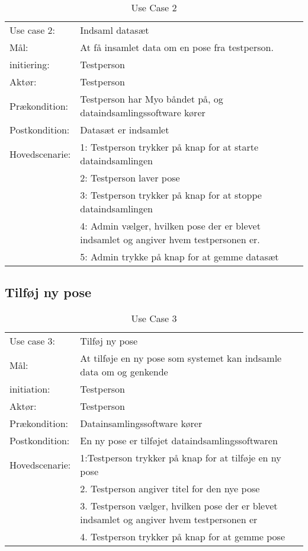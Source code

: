 \begin{center}
	\begin{table}[htbp]
		\begin{tabular}{lp{274pt}}
			\rowcolor{grey} Use case 2:		& Indsaml datasæt \\
			Mål: 	& At få insamlet data om en pose fra testperson. \\
			initiering:	& Testperson\\
			Aktør: & Testperson\\
			Prækondition: & Testperson har Myo båndet på, og dataindsamlingssoftware kører\\
			Postkondition: & Datasæt er indsamlet\\
			Hovedscenarie: & 1: Testperson trykker på knap for at starte dataindsamlingen\\
			& 2: Testperson laver pose\\
			& 3: Testperson trykker på knap for at stoppe dataindsamlingen\\
			& 4: Admin vælger, hvilken pose der er blevet indsamlet og angiver hvem testpersonen er.\\
			& 5: Admin trykke på knap for at gemme datasæt\\
		\end{tabular}
		\caption{Use Case 2}
	\end{table}
\end{center}

\subsection{Tilføj ny pose}
\begin{center}
	\begin{table}[htbp]
		\begin{tabular}{lp{274pt}}
			\rowcolor{grey} Use case 3:		& Tilføj ny pose\\
			Mål: 	& At tilføje en ny pose som systemet kan indsamle data om og genkende \\
			initiation:	& Testperson\\
			Aktør: & Testperson\\
			Prækondition: & Datainsamlingssoftware kører \\
			Postkondition: & En ny pose er tilføjet dataindsamlingssoftwaren\\
			Hovedscenarie: & 1:Testperson trykker på knap for at tilføje en ny pose\\
			& 2. Testperson angiver titel for den nye pose\\
			& 3. Testperson vælger, hvilken pose der er blevet indsamlet og angiver hvem testpersonen er\\
			& 4. Testperson trykker på knap for at gemme pose\\
		\end{tabular}
		\caption{Use Case 3}
	\end{table}
\end{center}

